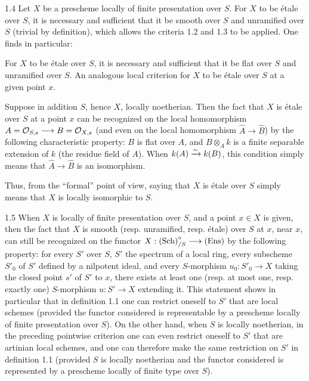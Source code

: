 \begin{proposition}{1.4}\label{XI.1.4}
Let $X$ be a prescheme locally of finite presentation over $S$. For $X$ to be étale over $S$, it is necessary and sufficient that it be smooth over $S$ and unramified over $S$ (trivial by definition), which allows the criteria 1.2 and 1.3 to be applied. One finds in particular:
\begin{enumeratei}
\item For $X$ to be étale over $S$, it is necessary and sufficient that it be flat over $S$ and unramified over $S$. An analogous local criterion for $X$ to be étale over $S$ at a given point $x$.
\item Suppose in addition $S$, hence $X$, locally noetherian. Then the fact that $X$ is étale over $S$ at a point $x$ can be recognized on the local homomorphism $A=\mathcal{O}_{S,s}\longrightarrow B=\mathcal{O}_{X,s}$ (and even on the local homomorphism $\widehat A\to\widehat B$) by the following characteristic property: $B$ is flat over $A$, and $B\otimes_A k$ is a finite separable extension of $k$ (the residue field of $A$). When $k(A)\xrightarrow{\sim} k(B)$, this condition simply means that $\widehat A\to\widehat B$ is an isomorphism.
\end{enumeratei}
\end{proposition}
Thus, from the ``formal'' point of view, saying that $X$ is étale over $S$ simply means that $X$ is locally isomorphic to $S$.

\begin{remark}{1.5}\label{XI.1.5}
When $X$ is locally of finite presentation over $S$, and a point $x\in X$ is given, then the fact that $X$ is smooth (resp. unramified, resp. étale) over $S$ at $x$, \ie near $x$, can still be recognized on the functor $X:\textup{(Sch)}^\circ_{/S}\longrightarrow\textup{(Ens)}$ by the following property: for every $S'$ over $S$, $S'$ the spectrum of a local ring, every subscheme $S'_0$ of $S'$ defined by a nilpotent ideal, and every $S$-morphism $u_0:S'_0\to X$ taking the closed point $s'$ of $S'$ to $x$, there exists at least one (resp. at most one, resp. exactly one) $S$-morphism $u:S'\to X$ extending it. This statement shows in particular that in definition 1.1 one can restrict oneself to $S'$ that are local schemes (provided the functor considered is representable by a prescheme locally of finite presentation over $S$). On the other hand, when $S$ is locally noetherian, in the preceding pointwise criterion one can even restrict oneself to $S'$ that are artinian local schemes, and one can therefore make the same restriction on $S'$ in definition 1.1 (provided $S$ is locally noetherian and the functor considered is represented by a prescheme locally of finite type over $S$).
\end{remark}

